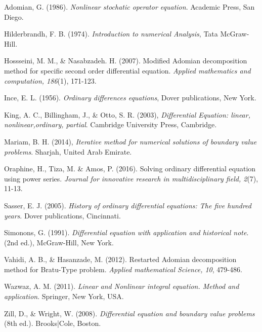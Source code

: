 \documentclass[11pt]{report}
\begin{document}
	\begin{description}
		\item Adomian, G. (1986). \emph{Nonlinear stochatic operator equation}. Academic Press, San Diego.
		
		\item Hilderbrandh, F. B. (1974). \emph{Introduction to numerical Analysis}, Tata McGraw-Hill.
		
		\item Hossseini, M. M., \& Nasabzadeh. H. (2007). Modified Adomian decomposition method for specific second order differential equation. \emph{Applied mathematics and computation, 186}(1), 171-123.
		
		\item Ince, E. L. (1956). \emph{Ordinary differences equations}, Dover publications, New York.
		
		\item King, A. C., Billingham, J., \& Otto, S. R. (2003), \emph{Differential Equation: linear, nonlinear,ordinary, partial}. Cambridge University Press, Cambridge.
		
		\item Mariam, B. H. (2014), \emph{Iterative method for numerical solutions of boundary value problems}. Sharjah, United Arab Emirate.
		
		\item Oraphine, H., Tiza, M. \& Amos, P. (2016). Solving ordinary differential equation using power series. \emph{Journal for innovative research in multidisciplinary field, 2}(7), 11-13.
		
		\item Sasser, E. J. (2005). \emph{History of ordinary differential equations: The five hundred years}. Dover publications, Cincinnati.
		
		\item Simonons, G. (1991). \emph{Differential equation with application and historical note}. (2nd ed.), McGraw-Hill, New York. 
		
		\item Vahidi, A. B., \& Hasanzade, M. (2012). Restarted Adomian decomposition method for Bratu-Type problem. \emph{Applied mathematical Science, 10}, 479-486.
		
		\item Wazwaz, A. M. (2011). \emph{Linear and Nonlinear integral equation. Method and application}. Springer, New York, USA.
		
		\item Zill, D., \& Wright, W. (2008). \emph{Differential equation and boundary value problems} (8th ed.). Brooks|Cole, Boston.
	\end{description}
	
\end{document}
